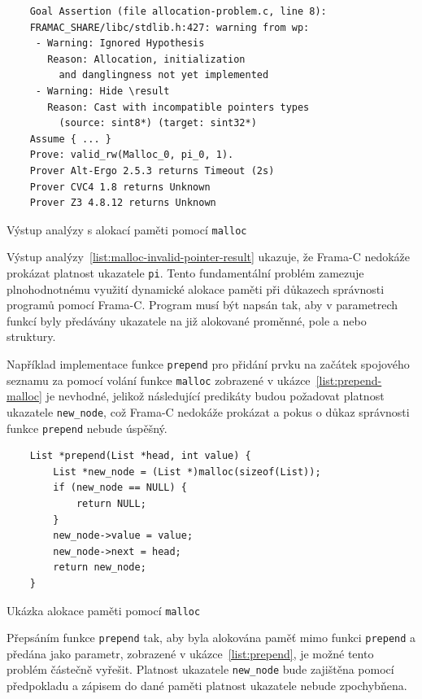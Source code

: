 \begin{listing}[H]
    \begin{verbatim}
    Goal Assertion (file allocation-problem.c, line 8):
    FRAMAC_SHARE/libc/stdlib.h:427: warning from wp:
     - Warning: Ignored Hypothesis
       Reason: Allocation, initialization
         and danglingness not yet implemented
     - Warning: Hide \result
       Reason: Cast with incompatible pointers types
         (source: sint8*) (target: sint32*)
    Assume { ... }
    Prove: valid_rw(Malloc_0, pi_0, 1).
    Prover Alt-Ergo 2.5.3 returns Timeout (2s)
    Prover CVC4 1.8 returns Unknown
    Prover Z3 4.8.12 returns Unknown
    \end{verbatim}
    \caption{Výstup analýzy s alokací paměti pomocí \texttt{malloc}}
    \label{list:malloc-invalid-pointer-result}
\end{listing}

Výstup analýzy~\ref{list:malloc-invalid-pointer-result} ukazuje,
že Frama\mbox{-}C nedokáže prokázat platnost ukazatele \texttt{pi}.
Tento fundamentální problém zamezuje plnohodnotnému využití dynamické alokace paměti
při důkazech správnosti programů pomocí Frama\mbox{-}C\@.
Program musí být napsán tak,
aby v parametrech funkcí byly předávány ukazatele na již alokované proměnné,
pole a nebo struktury.

Například implementace funkce \texttt{prepend} pro přidání prvku na začátek spojového seznamu
za pomocí volání funkce \texttt{malloc} zobrazené v ukázce~\ref{list:prepend-malloc} je nevhodné,
jelikož následující predikáty budou požadovat platnost ukazatele \texttt{new\_node},
což Frama\mbox{-}C nedokáže prokázat a pokus o důkaz správnosti funkce \texttt{prepend}
nebude úspěšný.

\begin{listing}[H]
    \begin{verbatim}
    List *prepend(List *head, int value) {
        List *new_node = (List *)malloc(sizeof(List));
        if (new_node == NULL) {
            return NULL;
        }
        new_node->value = value;
        new_node->next = head;
        return new_node;
    }
    \end{verbatim}
    \caption{Ukázka alokace paměti pomocí \texttt{malloc}}
    \label{list:prepend-malloc}
\end{listing}

Přepsáním funkce \texttt{prepend} tak,
aby byla alokována paměť mimo funkci \texttt{prepend} a předána jako parametr,
zobrazené v ukázce~\ref{list:prepend},
je možné tento problém částečně vyřešit.
Platnost ukazatele \texttt{new\_node} bude zajištěna pomocí předpokladu
a zápisem do dané paměti platnost ukazatele nebude zpochybňena.

